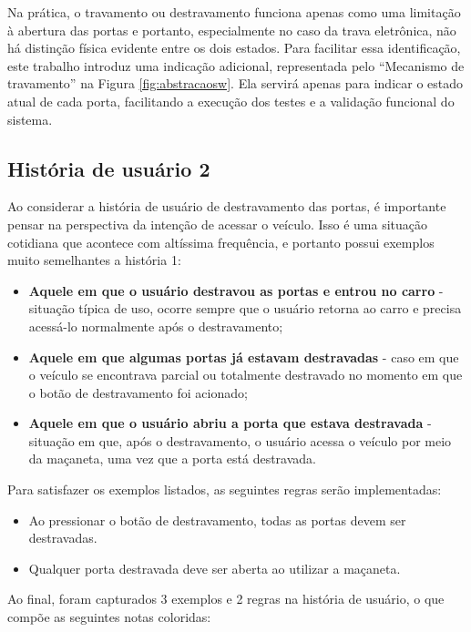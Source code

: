 Na prática, o travamento ou destravamento funciona apenas como uma limitação à abertura das portas e portanto, especialmente no caso da trava eletrônica, 
não há distinção física evidente entre os dois estados. Para facilitar essa identificação, este trabalho introduz uma indicação adicional, representada 
pelo ``Mecanismo de travamento'' na Figura \ref{fig:abstracaosw}. Ela servirá apenas para indicar o estado atual de cada porta, facilitando a execução dos 
testes e a validação funcional do sistema.

\subsection{História de usuário 2}
\label{sbs:historia2}

Ao considerar a história de usuário de destravamento das portas, é importante pensar na perspectiva da intenção de acessar o veículo. Isso é uma situação 
cotidiana que acontece com altíssima frequência, e portanto possui exemplos muito semelhantes a história 1:

\begin{itemize}
    \item \textbf{Aquele em que o usuário destravou as portas e entrou no carro} - situação típica de uso, ocorre sempre que o usuário retorna ao carro e precisa acessá-lo normalmente após o destravamento;
    \item \textbf{Aquele em que algumas portas já estavam destravadas} - caso em que o veículo se encontrava parcial ou totalmente destravado no momento em que o botão de destravamento foi acionado;
    \item \textbf{Aquele em que o usuário abriu a porta que estava destravada} -  situação em que, após o destravamento, o usuário acessa o veículo por meio da maçaneta, uma vez que a porta está destravada.
\end{itemize}

Para satisfazer os exemplos listados, as seguintes regras serão implementadas:

\begin{itemize}
    \item Ao pressionar o botão de destravamento, todas as portas devem ser destravadas.
    \item Qualquer porta destravada deve ser aberta ao utilizar a maçaneta.
\end{itemize}

Ao final, foram capturados 3 exemplos e 2 regras na história de usuário, o que compõe as seguintes notas coloridas:

